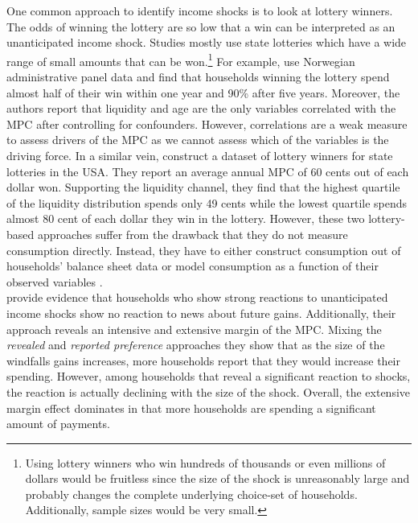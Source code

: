 One common approach to identify income shocks is to look at lottery winners. The odds of winning the lottery are so low that a win can be interpreted as an unanticipated income shock. Studies mostly use state lotteries which have a wide range of small amounts that can be won.\footnote{Using lottery winners who win hundreds of thousands or even millions of dollars would be fruitless since the size of the shock is unreasonably large and probably changes the complete underlying choice-set of households. Additionally, sample sizes would be very small.} For example, \cite{fagerengetal_2018} use Norwegian administrative panel data and find that households winning the lottery spend almost half of their win within one year and 90\% after five years. Moreover, the authors report that liquidity and age are the only variables correlated with the MPC after controlling for confounders. However, correlations are a weak measure to assess drivers of the MPC as we cannot assess which of the variables is the driving force. In a similar vein, \cite{golosovetal_2021} construct a dataset of lottery winners for state lotteries in the USA. They report an average annual MPC of 60 cents out of each dollar won. Supporting the liquidity channel, they find that the highest quartile of the liquidity distribution spends only 49 cents while the lowest quartile spends almost 80 cent of each dollar they win in the lottery. However, these two lottery-based approaches suffer from the drawback that they do not measure consumption directly. Instead, they have to either construct consumption out of households' balance sheet data \citep{fagerengetal_2018} or model consumption as a function of their observed variables \citep{golosovetal_2021}. \\
\cite{fusteretal_2021} provide evidence that households who show strong reactions to unanticipated income shocks show no reaction to news about future gains. Additionally, their approach reveals an intensive and extensive margin of the MPC. Mixing the \textit{revealed} and \textit{reported preference} approaches they show that as the size of the windfalls gains increases, more households report that they would increase their spending. However, among households that reveal a significant reaction to shocks, the reaction is actually declining with the size of the shock. Overall, the extensive margin effect dominates in that more households are spending a significant amount of payments. \\
